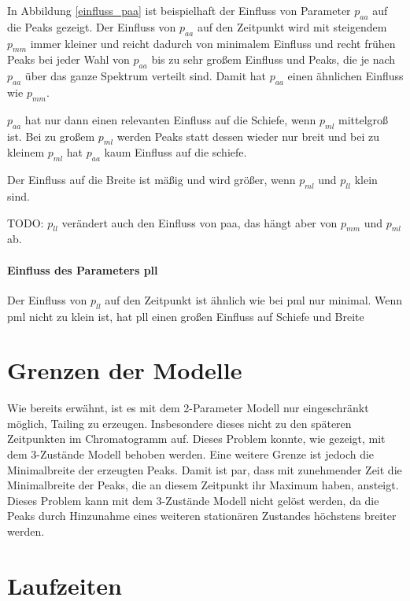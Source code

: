 In Abbildung \ref{einfluss_paa} ist beispielhaft der Einfluss von Parameter $p_{aa}$ auf die Peaks gezeigt. Der Einfluss von $p_{aa}$ auf den Zeitpunkt wird mit steigendem $p_{mm}$ immer kleiner und reicht dadurch von minimalem Einfluss und recht frühen Peaks bei jeder Wahl von $p_{aa}$ bis zu sehr großem Einfluss und Peaks, die je nach $p_{aa}$ über das ganze Spektrum verteilt sind. Damit hat $p_{aa}$ einen ähnlichen Einfluss wie $p_{mm}$.

$p_{aa}$ hat nur dann einen relevanten Einfluss auf die Schiefe, wenn $p_{ml}$ mittelgroß ist. Bei zu großem $p_{ml}$ werden Peaks statt dessen wieder nur breit und bei zu kleinem $p_{ml}$ hat $p_{aa}$ kaum Einfluss auf die schiefe. 

Der Einfluss auf die Breite ist mäßig und wird größer, wenn $p_{ml}$ und $p_{ll}$ klein sind.

TODO: $p_{ll}$ verändert auch den Einfluss von paa, das hängt aber von $p_{mm}$ und $p_{ml}$ ab.


\paragraph*{Einfluss des Parameters pll}

Der Einfluss von $p_{ll}$ auf den Zeitpunkt ist ähnlich wie bei pml nur minimal.
Wenn pml nicht zu klein ist, hat pll einen großen Einfluss auf Schiefe und Breite

\section{Grenzen der Modelle}

Wie bereits erwähnt, ist es mit dem 2-Parameter Modell nur eingeschränkt möglich, Tailing zu erzeugen. Insbesondere  dieses nicht zu den späteren Zeitpunkten im Chromatogramm auf. Dieses Problem konnte, wie gezeigt, mit dem 3-Zustände Modell behoben werden. 
Eine weitere Grenze ist jedoch die Minimalbreite der erzeugten Peaks. Damit ist par, dass mit zunehmender Zeit die Minimalbreite der Peaks, die an diesem Zeitpunkt ihr Maximum haben, ansteigt. 
Dieses Problem kann mit dem 3-Zustände Modell nicht gelöst werden, da die Peaks durch Hinzunahme eines weiteren stationären Zustandes höchstens breiter werden. 

\section{Laufzeiten}
